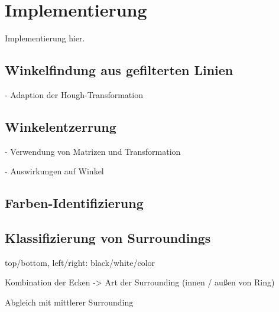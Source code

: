 
\section{Implementierung}
\label{sec:cv:implementierung}

Implementierung hier.

\subsection{Winkelfindung aus gefilterten Linien}
\label{sec:winkelfindung_impl}

- Adaption der Hough-Transformation


\subsection{Winkelentzerrung}
\label{sec:winkelentzerrung_impl}


- Verwendung von Matrizen und Transformation

- Auswirkungen auf Winkel

\subsection{Farben-Identifizierung}
\label{sec:farbidentifizierung_impl}


\subsection{Klassifizierung von Surroundings}
\label{sec:surroundings_impl}

top/bottom, left/right: black/white/color

Kombination der Ecken -> Art der Surrounding (innen / außen von Ring)

Abgleich mit mittlerer Surrounding
